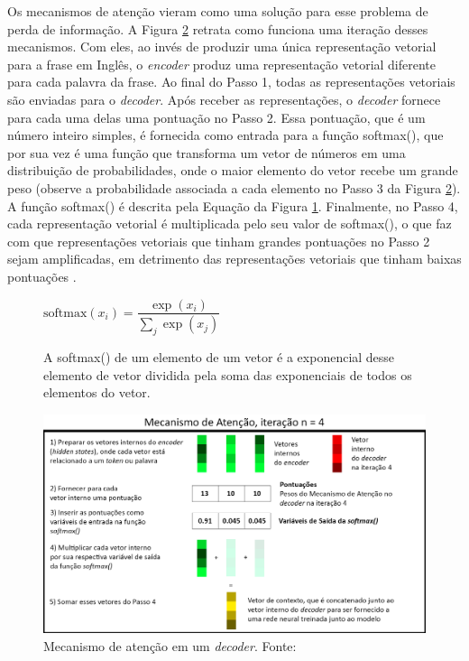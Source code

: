 Os mecanismos de atenção vieram como uma solução para esse problema de perda de informação. A Figura \ref{fig:decoder_attention} retrata como funciona uma iteração desses mecanismos. Com eles, ao invés de produzir uma única representação vetorial para a frase em Inglês, o \textit{encoder} produz uma representação vetorial diferente para cada palavra da frase. Ao final do Passo 1, todas as representações vetoriais são enviadas para o \textit{decoder}. Após receber as representações, o \textit{decoder} fornece para cada uma delas uma pontuação no Passo 2. Essa pontuação, que é um número inteiro simples, é fornecida como entrada para a função softmax(), que por sua vez é uma função que transforma um vetor de números em uma distribuição de probabilidades, onde o maior elemento do vetor recebe um grande peso (observe a probabilidade associada a cada elemento no Passo 3 da Figura \ref{fig:decoder_attention}). A função softmax() é descrita pela Equação da Figura \ref{eq_softmax}. Finalmente, no Passo 4, cada representação vetorial é multiplicada pelo seu valor de softmax(), o que faz com que representações vetoriais que tinham grandes pontuações no Passo 2 sejam amplificadas, em detrimento das representações vetoriais que tinham baixas pontuações \cite{attention_explained} \cite{attention_paper1} \cite{attention_paper2}.

\begin{figure}[h!t]
  \centering 
    $\text{softmax}(x_i) = \dfrac{\exp(x_i)}{\sum_j \exp(x_j)}$
    \caption{A softmax() de um elemento de um vetor é a exponencial desse elemento de vetor dividida pela soma das exponenciais de todos os elementos do vetor.}
    \label{eq_softmax}
\end{figure}    

\begin{figure}[htb]
        \centering
        \includegraphics[width=14cm]{figuras/mecanismo_de_atencao.png}
        \caption{Mecanismo de atenção em um \textit{decoder}. Fonte: \cite{attention_explained}}
        \label{fig:decoder_attention}
    \end{figure}

